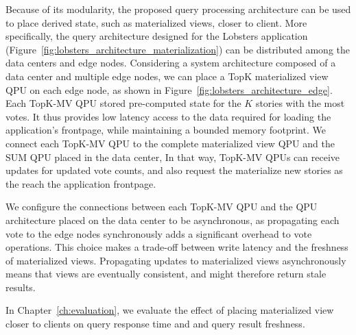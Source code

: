 Because of its modularity, the proposed query processing architecture can be used to place derived state, such as materialized views,
closer to client.
More specifically,
the query architecture designed for the Lobsters application (Figure~\ref{fig:lobsters_architecture_materialization}) can be
distributed among the data centers and edge nodes.
Considering a system architecture composed of a data center and multiple edge nodes,
we can place a TopK materialized view QPU on each edge node, as shown in Figure~\ref{fig:lobsters_architecture_edge}.
Each TopK-MV QPU stored pre-computed state for the $K$ stories with the most votes.
It thus provides low latency access to the data required for loading the application's frontpage,
while maintaining a bounded memory footprint.
We connect each TopK-MV QPU to the complete materialized view QPU and the SUM QPU placed in the data center,
In that way, TopK-MV QPUs can receive updates for updated vote counts,
and also request the materialize new stories as the reach the application frontpage.

We configure the connections between each TopK-MV QPU and the QPU architecture placed on the data center to be asynchronous,
as propagating each vote to the edge nodes synchronously adds a significant overhead to vote operations.
This choice makes a trade-off between write latency and the freshness of materialized views.
Propagating updates to materialized views asynchronously means that views are eventually consistent,
and might therefore return stale results.

In Chapter~\ref{ch:evaluation}, we evaluate the effect of placing materialized view closer to clients on query response time and
and query result freshness.